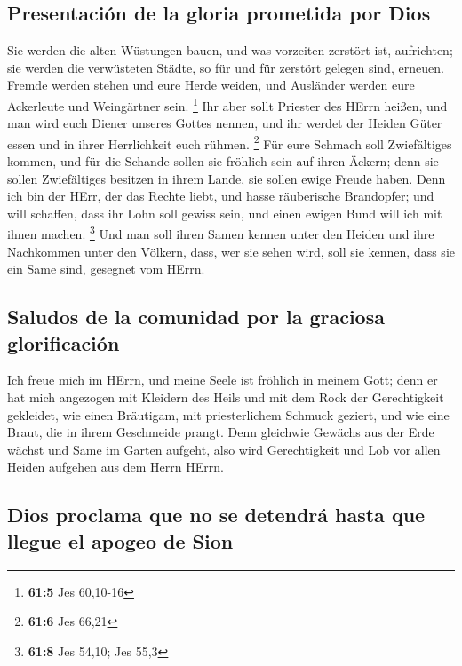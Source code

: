 \hypertarget{presentaciuxf3n-de-la-gloria-prometida-por-dios}{%
\subsection{Presentación de la gloria prometida por
Dios}\label{presentaciuxf3n-de-la-gloria-prometida-por-dios}}

 Sie werden die alten Wüstungen bauen, und was vorzeiten
zerstört ist, aufrichten; sie werden die verwüsteten Städte, so für und
für zerstört gelegen sind, erneuen.  Fremde werden stehen
und eure Herde weiden, und Ausländer werden eure Ackerleute und
Weingärtner sein. \footnote{\textbf{61:5} Jes 60,10-16} 
Ihr aber sollt Priester des HErrn heißen, und man wird euch Diener
unseres Gottes nennen, und ihr werdet der Heiden Güter essen und in
ihrer Herrlichkeit euch rühmen. \footnote{\textbf{61:6} Jes 66,21}
 Für eure Schmach soll Zwiefältiges kommen, und für die
Schande sollen sie fröhlich sein auf ihren Äckern; denn sie sollen
Zwiefältiges besitzen in ihrem Lande, sie sollen ewige Freude haben.
 Denn ich bin der HErr, der das Rechte liebt, und hasse
räuberische Brandopfer; und will schaffen, dass ihr Lohn soll gewiss
sein, und einen ewigen Bund will ich mit ihnen machen. \footnote{\textbf{61:8}
  Jes 54,10; Jes 55,3}  Und man soll ihren Samen kennen
unter den Heiden und ihre Nachkommen unter den Völkern, dass, wer sie
sehen wird, soll sie kennen, dass sie ein Same sind, gesegnet vom HErrn.

\hypertarget{saludos-de-la-comunidad-por-la-graciosa-glorificaciuxf3n}{%
\subsection{Saludos de la comunidad por la graciosa
glorificación}\label{saludos-de-la-comunidad-por-la-graciosa-glorificaciuxf3n}}

 Ich freue mich im HErrn, und meine Seele ist fröhlich in
meinem Gott; denn er hat mich angezogen mit Kleidern des Heils und mit
dem Rock der Gerechtigkeit gekleidet, wie einen Bräutigam, mit
priesterlichem Schmuck geziert, und wie eine Braut, die in ihrem
Geschmeide prangt.  Denn gleichwie Gewächs aus der Erde
wächst und Same im Garten aufgeht, also wird Gerechtigkeit und Lob vor
allen Heiden aufgehen aus dem Herrn HErrn.

\hypertarget{dios-proclama-que-no-se-detendruxe1-hasta-que-llegue-el-apogeo-de-sion}{%
\subsection{Dios proclama que no se detendrá hasta que llegue el apogeo
de
Sion}\label{dios-proclama-que-no-se-detendruxe1-hasta-que-llegue-el-apogeo-de-sion}}

